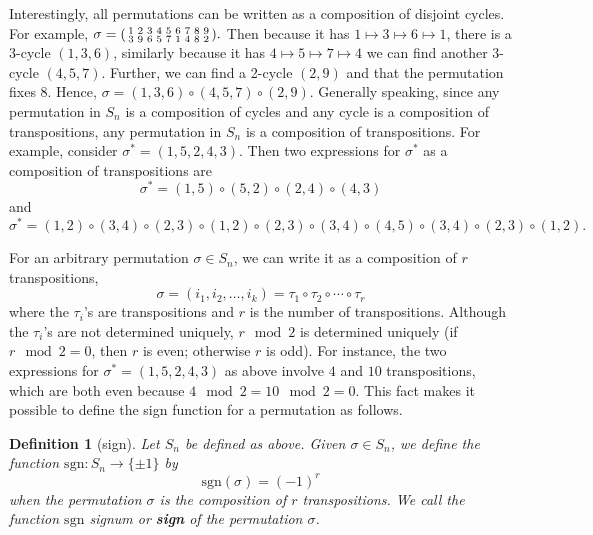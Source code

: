 \documentclass{article}
\newcommand{\sgn}{{\mathrm{sgn}}}
\newenvironment{psmallmatrix}
  {\left(\begin{smallmatrix}}
  {\end{smallmatrix}\right)}
\newtheorem{df}{Definition}[section]
\begin{document}
Interestingly, all permutations can be written as a composition of disjoint cycles. 
For example, $\sigma=\begin{psmallmatrix} 1 & 2 &3 &4 &5 &6 &7 &8 &9 \\
											3 &9& 6 &5 &7 &1 &4 &8 &2\end{psmallmatrix}.$
Then because it has $1 \mapsto 3\mapsto 6\mapsto 1$, there is a 3-cycle $(1,3,6)$, 
similarly because it has $4\mapsto 5\mapsto 7\mapsto 4$ we can find another 3-cycle $(4,5,7)$.
Further, we can find a 2-cycle $(2,9)$ and that the permutation fixes 8. 
Hence, $\sigma=(1,3,6)\circ(4,5,7)\circ(2,9).$
Generally speaking, since any permutation in $S_n$ is a composition of cycles and 
any cycle is a composition of transpositions, any permutation in $S_n$ is a composition of transpositions.
For example, consider $\sigma^\ast=(1,5,2,4,3)$. Then two expressions for $\sigma^\ast$ as a composition of transpositions are
\begin{equation*}
\sigma^\ast=(1,5)\circ(5,2)\circ(2,4)\circ(4,3)
\end{equation*}
and
\begin{equation*}
\sigma^\ast=(1,2)\circ(3,4)\circ(2,3)\circ(1,2)\circ(2,3)\circ(3,4)\circ(4,5)\circ(3,4)\circ(2,3)\circ(1,2).
\end{equation*}

For an arbitrary permutation $\sigma\in S_n$, we can write it as
a composition of $r$ transpositions,
\begin{equation*}
\sigma=(i_1,i_2,\ldots,i_k)=\tau_1\circ\tau_2\circ\cdots\circ\tau_r
\end{equation*}
where the $\tau_i$'s are transpositions and $r$ is the number of transpositions.
Although the $\tau_i$'s are not determined uniquely, $r \mod 2$ is determined uniquely 
(if $r\mod 2=0$, then $r$ is even; otherwise $r$ is odd). 
For instance, the two expressions for $\sigma^\ast=(1,5,2,4,3)$ as above involve $4$ and $10$ transpositions, 
which are both even because $4\mod 2=10\mod 2=0$. This fact makes it possible to define the sign function for a
permutation as follows.



\begin{df}[sign]
Let $S_n$ be defined as above. Given $\sigma\in S_n$, we define the function $\sgn:S_n\rightarrow \{\pm 1\}$  by
\begin{equation*}
\sgn(\sigma)=(-1)^r
\end{equation*}
when the permutation $\sigma$ is the composition of $r$ transpositions.
We call the function $\sgn$ signum or \textbf{sign} of the permutation $\sigma$.
\end{df}
\end{document}
